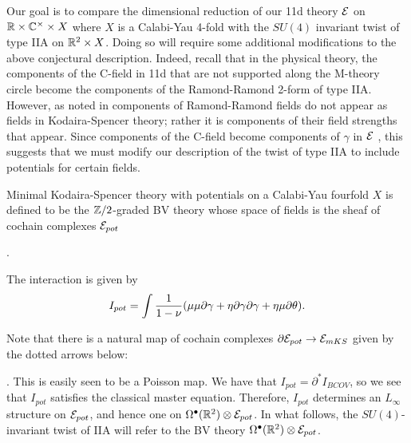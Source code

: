 
Our goal is to compare the dimensional reduction of our 11d theory $\mathcal E$ on $\mathbb{R}\times \mathbb{C}^{\times}\times X$ where $X$ is a Calabi-Yau 4-fold with the $SU(4)$ invariant twist of type IIA on $\mathbb{R}^{2}\times X$. Doing so will require some additional modifications to the above conjectural description. Indeed, recall that in the physical theory, the components of the C-field in 11d that are not supported along the M-theory circle become the components of the Ramond-Ramond 2-form of type IIA. However, as noted in \cite{CLSugra} components of Ramond-Ramond fields do not appear as fields in Kodaira-Spencer theory; rather it is components of their field strengths that appear. Since components of the C-field become components of $\gamma$ in $\mathcal E$ , this suggests that we must modify our description of the twist of type IIA to include potentials for certain fields.

Minimal Kodaira-Spencer theory with potentials on a Calabi-Yau fourfold $X$ is defined to be the $\mathbb{Z}/2$-graded BV theory whose space of fields is the sheaf of cochain complexes $\mathcal E_{pot}$
\beqn
{}
\eeqn.

The interaction is given by \[I_{pot} = \int \frac{1}{1-\nu}(\mu\mu\partial\gamma + \eta\partial\gamma\partial\gamma + \eta\mu\partial\theta).\]


Note that there is a natural map of cochain complexes $\partial \mathcal E_{pot}\to \mathcal E_{mKS}$ given by the dotted arrows below:
\beqn
{}.
\eeqn
This is easily seen to be a Poisson map. We have that $I_{pot} = \partial^{*}I_{BCOV}$, so we see that $I_{pot}$ satisfies the classical master equation. Therefore, $I_{pot}$ determines an $L_{\infty}$ structure on $\mathcal E_{pot}$, and hence one on $\Omega^{\bullet}(\mathbb{R}^{2})\otimes \mathcal E_{pot}$. In what follows, the $SU(4)$-invariant twist of IIA will refer to the BV theory $\Omega^{\bullet}(\mathbb{R}^{2})\otimes \mathcal E_{pot}$.

